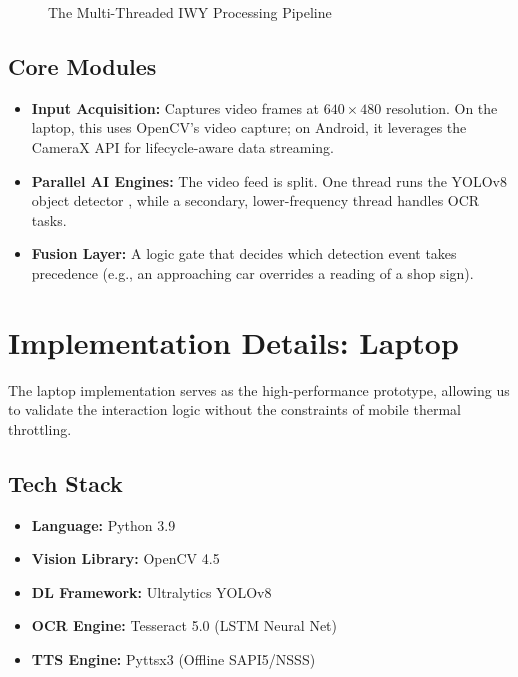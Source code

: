 \documentclass[11pt, a4paper, twocolumn]{article}
\begin{document}
\begin{figure}[h]
    \centering
    \caption{The Multi-Threaded IWY Processing Pipeline}
    \label{fig:architecture}
\end{figure}

\subsection{Core Modules}
\begin{itemize}
    \item \textbf{Input Acquisition:} Captures video frames at $640 \times 480$ resolution. On the laptop, this uses OpenCV's video capture; on Android, it leverages the CameraX API for lifecycle-aware data streaming.
    \item \textbf{Parallel AI Engines:} The video feed is split. One thread runs the YOLOv8 object detector \cite{redmon2016}, while a secondary, lower-frequency thread handles OCR tasks.
    \item \textbf{Fusion Layer:} A logic gate that decides which detection event takes precedence (e.g., an approaching car overrides a reading of a shop sign).
\end{itemize}

\section{Implementation Details: Laptop}
The laptop implementation serves as the high-performance prototype, allowing us to validate the interaction logic without the constraints of mobile thermal throttling.

\subsection{Tech Stack}
\begin{itemize}
    \item \textbf{Language:} Python 3.9
    \item \textbf{Vision Library:} OpenCV 4.5
    \item \textbf{DL Framework:} Ultralytics YOLOv8 \cite{ultralytics}
    \item \textbf{OCR Engine:} Tesseract 5.0 \cite{tesseract} (LSTM Neural Net)
    \item \textbf{TTS Engine:} Pyttsx3 (Offline SAPI5/NSSS)
\end{itemize}
\end{document}
